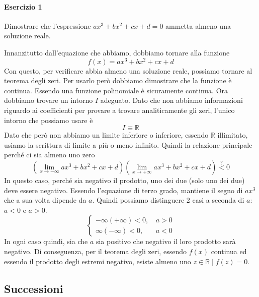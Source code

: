 \paragraph{Esercizio 1}
Dimostrare che l'espressione $ax^3+bx^2+cx+d=0$ ammetta almeno una soluzione reale.
\divisor

Innanzitutto dall'equazione che abbiamo, dobbiamo tornare alla funzione
\begin{equation*}
  f(x) = ax^3+bx^2+cx+d
\end{equation*}
Con questo, per verificare abbia almeno una soluzione reale, possiamo tornare al teorema degli
zeri. Per usarlo però dobbiamo dimostrare che la funzione è continua. Essendo una funzione
polinomiale è sicuramente continua. Ora dobbiamo trovare un intorno $I$ adeguato. Dato che non
abbiamo informazioni riguardo ai coefficienti per provare a trovare analiticamente gli zeri,
l'unico intorno che possiamo usare è
\begin{equation*}
  I\equiv\mathbb{R}
\end{equation*}
Dato che però non abbiamo un limite inferiore o inferiore, essendo $\mathbb{R}$ illimitato, 
usiamo la scrittura di limite a più o meno infinito. Quindi la relazione principale perché
ci sia almeno uno zero
\begin{equation*}
  \left( \lim\limits_{x\to-\infty} ax^3+bx^2+cx+d \right)
  \left( \lim\limits_{x\to+\infty} ax^3+bx^2+cx+d \right) \overset{?}{<} 0
\end{equation*}
In questo caso, perché sia negativo il prodotto, uno dei due (solo uno dei due) deve essere
negativo. Essendo l'equazione di terzo grado, mantiene il segno di $ax^3$ che a sua volta dipende
da $a$. Quindi possiamo distinguere 2 casi a seconda di $a$: $a<0$ e $a>0$.
\begin{equation*}
  \begin{cases}
    -\infty(+\infty) < 0,&\, a>0\\
    \infty(-\infty) < 0,&\, a<0
  \end{cases}
\end{equation*}
In ogni caso quindi, sia che $a$ sia positivo che negativo il loro prodotto sarà negativo. Di
conseguenza, per il teorema degli zeri, essendo $f(x)$ continua ed essendo il prodotto degli
estremi negativo, esiste almeno uno $z\in\mathbb{R}\mid f(z)=0$.

\subsection*{Successioni}
\label{sub:successioni}

